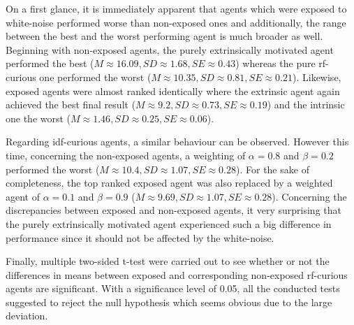 \documentclass[draft,final]{vutinfth} %
\begin{document}
    On a first glance, it is immediately apparent that agents which were exposed to white-noise performed worse than non-exposed ones and additionally, the range between the best and the worst performing agent is much broader as well.
    Beginning with non-exposed agents, the purely extrinsically motivated agent performed the best ($M\approx16.09,SD\approx1.68,SE\approx0.43$) whereas the pure \gls{rf}-curious one performed the worst ($M\approx10.35,SD\approx0.81,SE\approx0.21$).
    Likewise, exposed agents were almost ranked identically where the extrinsic agent again achieved the best final result ($M\approx9.2,SD\approx0.73,SE\approx0.19$) and the intrinsic one the worst ($M\approx1.46,SD\approx0.25,SE\approx0.06$).

    Regarding \gls{idf}-curious agents, a similar behaviour can be observed.
    However this time, concerning the non-exposed agents, a weighting of $\alpha=0.8$ and $\beta=0.2$ performed the worst ($M\approx10.4,SD\approx1.07,SE\approx0.28$).
    For the sake of completeness, the top ranked exposed agent was also replaced by a weighted agent of $\alpha=0.1$ and $\beta=0.9$ ($M\approx9.69,SD\approx1.07,SE\approx0.28$).
    Concerning the discrepancies between exposed and non-exposed agents, it very surprising that the purely extrinsically motivated agent experienced such a big difference in performance since it should not be affected by the white-noise.

    Finally, multiple two-sided t-test were carried out to see whether or not the differences in means between exposed and corresponding non-exposed \gls{rf}-curious agents are significant.
    With a significance level of 0.05, all the conducted tests suggested to reject the null hypothesis which seems obvious due to the large deviation.
\end{document}
